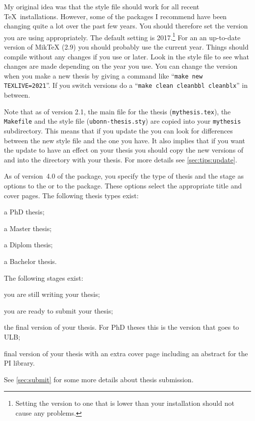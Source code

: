 My original idea was that the style file should work for all recent
\TeX\ installations.  However, some of the packages I recommend have
been changing quite a lot over the past few years.
You should therefore set the \TeXLive version you are using appropriately.
The default setting is 2017.\footnote{%
Setting the \TeXLive version to one that is lower than your installation should not cause any problems.}
For an an up-to-date version of MikTeX (2.9) you should probably use the current year.
Things should compile without any changes if you use  or later.
Look in the style file to see what changes are made depending on the year you use.
You can change the \TeXLive version when you make a new thesis
by giving a command like \enquote{\texttt{make new TEXLIVE=2021}}. %
If you switch \TeXLive versions do a
\enquote{\texttt{make clean cleanbbl cleanblx}} in between.

Note that as of version 2.1, the main file for the thesis
(\texttt{mythesis.tex}), the \texttt{Makefile} and the style file
(\texttt{ubonn-thesis.sty}) are copied into your \texttt{mythesis}
subdirectory. This means that if you update the 
you can look for differences between the new style file and the one
you have. It also implies that if you want the update to have an
effect on your thesis you should copy the new versions of
 and  into the directory with your thesis.
For more details see \cref{sec:tips:update}.

As of version~4.0 of the package, you specify the type of thesis and the stage as options
to the  or to the  package.
These options select the appropriate title and cover pages.
The following thesis types exist:
\begin{description}\setlength{\parskip}{0pt}\setlength{\itemsep}{0pt}
\item[PhD] a PhD thesis;
\item[Master] a Master thesis;
\item[Diplom] a Diplom thesis;
\item[Bachelor] a Bachelor thesis.
\end{description}
The following stages exist:
\begin{description}\setlength{\parskip}{0pt}\setlength{\itemsep}{0pt}
\item[Draft] you are still writing your thesis;
\item[Submit] you are ready to submit your thesis;
\item[Final] the final version of your thesis.
  For PhD theses this is the version that goes to ULB\@;
\item[PILibrary] final version of your thesis with an extra cover page
  including an abstract for the PI library.
\end{description}
See \cref{sec:submit} for some more details about thesis submission.


